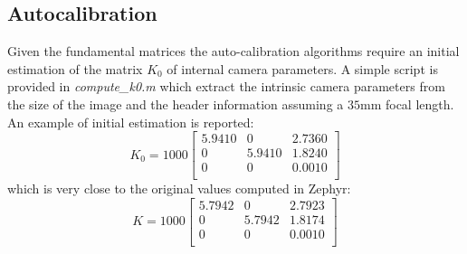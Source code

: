 \documentclass[11pt]{article}
\begin{document}
\subsection{Autocalibration}
Given the fundamental matrices the auto-calibration algorithms require an initial estimation of the matrix $K_0$ of internal camera parameters. A simple script is provided in \textit{compute\_k0.m} which extract the intrinsic camera parameters from the size of the image and the header information assuming a $35$mm focal length. An example of initial estimation is reported:
\begin{equation*}
K_0 = 1000 \begin{bmatrix}
    5.9410   &      0   & 2.7360\\
         0   & 5.9410    &1.8240\\
         0    &     0    &0.0010\\
    
        \end{bmatrix}
\end{equation*}
which is very close to the original values computed in Zephyr:
\begin{equation*}
    K = 1000 \begin{bmatrix}
     5.7942 &        0 &   2.7923\\
          0  &  5.7942  &  1.8174\\
          0  &       0  &  0.0010\\
        \end{bmatrix}
    \end{equation*}
\end{document}
